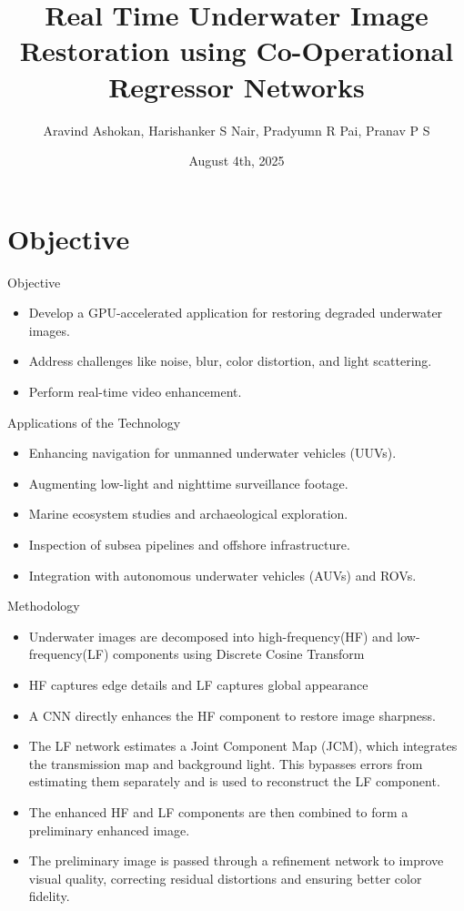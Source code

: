 \documentclass[aspectratio=169,xcolor=dvipsnames]{beamer}
\title{Real Time Underwater Image Restoration
using Co-Operational Regressor Networks}
\author{Aravind Ashokan, Harishanker S Nair, Pradyumn R Pai, Pranav P S}
\institute
{
    Department of Computer Science and Engineering \\
    Govt. Model Engineering College
}
\date{August 4th, 2025} %
\begin{document}
\begin{frame}
    \titlepage
\end{frame}


\section{Objective}
\begin{frame}{Objective}
\begin{itemize}
    \item Develop a GPU-accelerated application for restoring degraded underwater images.
    \item Address challenges like noise, blur, color distortion, and light scattering.
    \item Perform real-time video enhancement.
\end{itemize}
\end{frame}

\begin{frame}{Applications of the Technology}
\begin{itemize}
    \item Enhancing navigation for unmanned underwater vehicles (UUVs).
    \item Augmenting low-light and nighttime surveillance footage.
    \item Marine ecosystem studies and archaeological exploration.
    \item Inspection of subsea pipelines and offshore infrastructure.
    \item Integration with autonomous underwater vehicles (AUVs) and ROVs.
\end{itemize}
\end{frame}

\begin{frame}{Methodology}
\begin{itemize}
    \item Underwater images are decomposed into high-frequency(HF) and low-frequency(LF) components using Discrete Cosine Transform
    \item HF captures edge details and LF captures global appearance
    \item A CNN directly enhances the HF component to restore image sharpness.
    \item The LF network estimates a Joint Component Map (JCM), which integrates the transmission map and background light. This bypasses errors from estimating them separately and is used to reconstruct the LF component.
    \item The enhanced HF and LF components are then combined to form a preliminary enhanced image.
    \item The preliminary image is passed through a refinement network to improve visual quality, correcting residual distortions and ensuring better color fidelity.
\end{itemize}
\end{frame}
\end{document}
